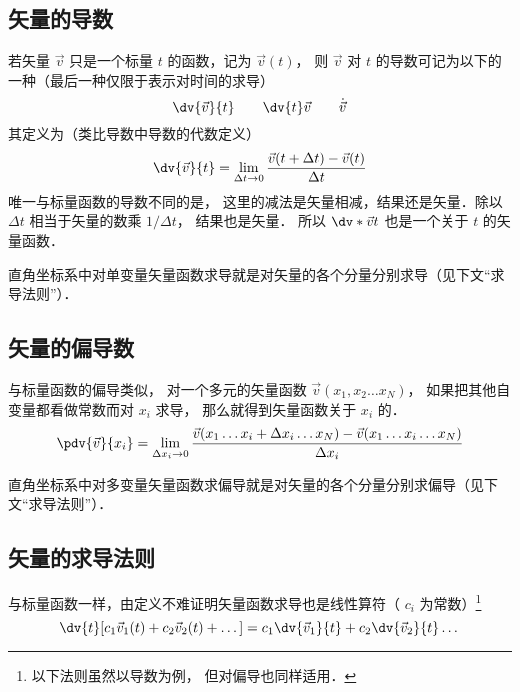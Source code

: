 

\subsection{矢量的导数}

若矢量 $\vec v$ 只是一个标量 $t$ 的函数，记为 $\vec v(t)$， 则 $\vec v$ 对 $t$ 的导数可记为以下的一种（最后一种仅限于表示对时间的求导）
\begin{equation}
\dv{\vec v}{t} \qquad \dv{t}\vec v \qquad \dot{\vec v}
\end{equation}
其定义为（类比导数中导数的代数定义）
\begin{equation}
\dv{\vec v}{t} = \lim_{\Delta t \to 0} \frac{\vec v ( t + \Delta t) - \vec v(t)}{\Delta t}
\end{equation}
唯一与标量函数的导数不同的是， 这里的减法是矢量相减，结果还是矢量．除以 $\Delta t$ 相当于矢量的数乘 $1/\Delta t$， 结果也是矢量． 所以 $\dv*{\vec v}{t}$ 也是一个关于 $t$ 的矢量函数．

直角坐标系中对单变量矢量函数求导就是对矢量的各个分量分别求导（见下文“求导法则”）．

\subsection{矢量的偏导数}
与标量函数的偏导类似， 对一个多元的矢量函数 $\vec v(x_1, x_2\ldots x_N)$， 如果把其他自变量都看做常数而对 $x_i$ 求导， 那么就得到矢量函数关于 $x_i$ 的．
\begin{equation}
\pdv{\vec v}{x_i} = \lim_{\Delta x_i \to 0} \frac{\vec v(x_1 \ldots x_i+\Delta x_i\ldots x_N) -  \vec v(x_1 \ldots x_i\ldots x_N)}{\Delta x_i}
\end{equation}

直角坐标系中对多变量矢量函数求偏导就是对矢量的各个分量分别求偏导（见下文“求导法则”）．

\subsection{矢量的求导法则}
与标量函数一样，由定义不难证明矢量函数求导也是线性算符（ $c_i$ 为常数）\footnote{以下法则虽然以导数为例， 但对偏导也同样适用．}
\begin{equation}
\dv{t}[c_1 \vec v_1(t) + c_2 \vec v_2(t) + \dots] = c_1\dv{\vec v_1}{t} + c_2\dv{\vec v_2}{t} \dots
\end{equation}

